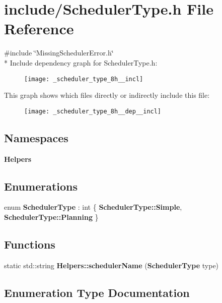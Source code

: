 \section{include/\+Scheduler\+Type.h File Reference}
\label{_scheduler_type_8h}
{\ttfamily \#include \char`\"{}Missing\+Scheduler\+Error.\+h\char`\"{}}\\*
Include dependency graph for Scheduler\+Type.\+h\+:
\nopagebreak
\begin{figure}[H]
\begin{center}
\leavevmode
\texttt{[image: \_scheduler\_type\_8h\_\_incl]}
\end{center}
\end{figure}
This graph shows which files directly or indirectly include this file\+:
\nopagebreak
\begin{figure}[H]
\begin{center}
\leavevmode
\texttt{[image: \_scheduler\_type\_8h\_\_dep\_\_incl]}
\end{center}
\end{figure}
\subsection*{Namespaces}
\begin{DoxyCompactItemize}
\item 
 {\bf Helpers}
\end{DoxyCompactItemize}
\subsection*{Enumerations}
\begin{DoxyCompactItemize}
\item 
enum {\bf Scheduler\+Type} \+: int \{ {\bf Scheduler\+Type\+::\+Simple}, 
{\bf Scheduler\+Type\+::\+Planning}
 \}
\end{DoxyCompactItemize}
\subsection*{Functions}
\begin{DoxyCompactItemize}
\item 
static std\+::string {\bf Helpers\+::scheduler\+Name} ({\bf Scheduler\+Type} type)
\end{DoxyCompactItemize}


\subsection{Enumeration Type Documentation}
